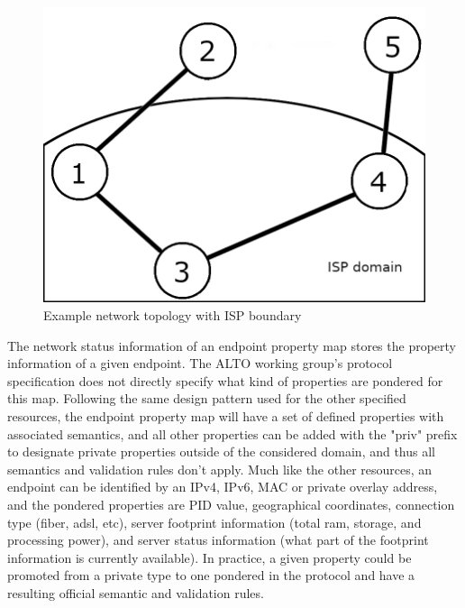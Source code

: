 \begin{figure}[!h]
        \centering
        \includegraphics[scale=1.00]{img/topology-boundary.png}
        \caption{Example network topology with ISP boundary}
        \label{fig:example-topology-boundary}
\end{figure}

    The network status information of an endpoint property map stores the property information of a given endpoint.
    The ALTO working group's protocol specification \cite{alto-protocol} does not directly specify what kind of properties are pondered for this map.
    Following the same design pattern used for the other specified resources, the endpoint property map will have a set of defined properties with associated semantics, and all other properties can be added with the "priv" prefix to designate private properties outside of the considered domain, and thus all semantics and validation rules don't apply.
    Much like the other resources, an endpoint can be identified by an IPv4, IPv6, MAC or private overlay address, and the pondered properties are PID value, geographical coordinates, connection type (fiber, adsl, etc), server footprint information (total ram, storage, and processing power), and server status information (what part of the footprint information is currently available).
    In practice, a given property could be promoted from a private type to one pondered in the protocol and have a resulting official semantic and validation rules.

